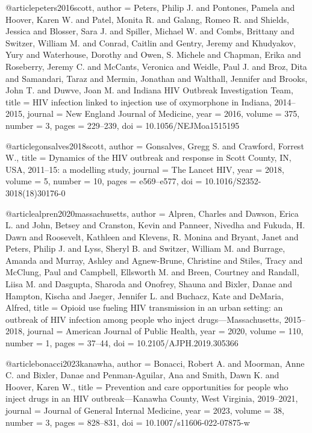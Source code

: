 @article{peters2016scott,
  author  = {Peters, Philip J. and Pontones, Pamela and Hoover, Karen W. and Patel, Monita R. and Galang, Romeo R. and Shields, Jessica and Blosser, Sara J. and Spiller, Michael W. and Combs, Brittany and Switzer, William M. and Conrad, Caitlin and Gentry, Jeremy and Khudyakov, Yury and Waterhouse, Dorothy and Owen, S. Michele and Chapman, Erika and Roseberry, Jeremy C. and McCants, Veronica and Weidle, Paul J. and Broz, Dita and Samandari, Taraz and Mermin, Jonathan and Walthall, Jennifer and Brooks, John T. and Duwve, Joan M. and {Indiana HIV Outbreak Investigation Team}},
  title   = {{HIV} infection linked to injection use of oxymorphone in {Indiana, 2014--2015}},
  journal = {New England Journal of Medicine},
  year    = {2016},
  volume  = {375},
  number  = {3},
  pages   = {229--239},
  doi     = {10.1056/NEJMoa1515195}
}

@article{gonsalves2018scott,
  author  = {Gonsalves, Gregg S. and Crawford, Forrest W.},
  title   = {Dynamics of the {HIV} outbreak and response in {Scott County, IN, USA}, 2011--15: a modelling study},
  journal = {The Lancet HIV},
  year    = {2018},
  volume  = {5},
  number  = {10},
  pages   = {e569--e577},
  doi     = {10.1016/S2352-3018(18)30176-0}
}

@article{alpren2020massachusetts,
  author  = {Alpren, Charles and Dawson, Erica L. and John, Betsey and Cranston, Kevin and Panneer, Nivedha and Fukuda, H. Dawn and Roosevelt, Kathleen and Klevens, R. Monina and Bryant, Janet and Peters, Philip J. and Lyss, Sheryl B. and Switzer, William M. and Burrage, Amanda and Murray, Ashley and Agnew-Brune, Christine and Stiles, Tracy and McClung, Paul and Campbell, Ellsworth M. and Breen, Courtney and Randall, Liisa M. and Dasgupta, Sharoda and Onofrey, Shauna and Bixler, Danae and Hampton, Kischa and Jaeger, Jennifer L. and Buchacz, Kate and DeMaria, Alfred},
  title   = {Opioid use fueling {HIV} transmission in an urban setting: an outbreak of {HIV} infection among people who inject drugs---{Massachusetts}, 2015--2018},
  journal = {American Journal of Public Health},
  year    = {2020},
  volume  = {110},
  number  = {1},
  pages   = {37--44},
  doi     = {10.2105/AJPH.2019.305366}
}

@article{bonacci2023kanawha,
  author  = {Bonacci, Robert A. and Moorman, Anne C. and Bixler, Danae and Penman-Aguilar, Ana and Smith, Dawn K. and Hoover, Karen W.},
  title   = {Prevention and care opportunities for people who inject drugs in an {HIV} outbreak---{Kanawha County, West Virginia}, 2019--2021},
  journal = {Journal of General Internal Medicine},
  year    = {2023},
  volume  = {38},
  number  = {3},
  pages   = {828--831},
  doi     = {10.1007/s11606-022-07875-w}
}

